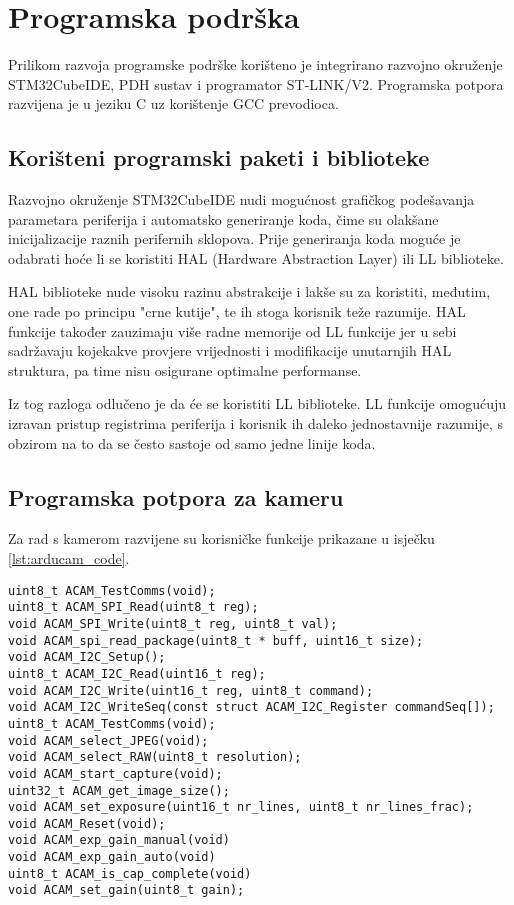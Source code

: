 \chapter{Programska podrška}

Prilikom razvoja programske podrške korišteno je integrirano razvojno okruženje STM32CubeIDE, PDH sustav i programator ST-LINK/V2. Programska potpora razvijena je u jeziku C uz korištenje GCC prevodioca.

\section{Korišteni programski paketi i biblioteke}

Razvojno okruženje STM32CubeIDE nudi mogućnost grafičkog podešavanja parametara periferija i automatsko generiranje koda, čime su olakšane inicijalizacije raznih perifernih sklopova. Prije generiranja koda moguće je odabrati hoće li se koristiti HAL \engl(Hardware Abstraction Layer) ili LL  biblioteke.

HAL biblioteke nude visoku razinu abstrakcije i lakše su za koristiti, međutim, one rade po principu "crne kutije", te ih stoga korisnik teže razumije. HAL funkcije također zauzimaju više radne memorije od LL funkcije jer u sebi sadržavaju kojekakve provjere vrijednosti i modifikacije unutarnjih HAL struktura, pa time nisu osigurane optimalne performanse.

Iz tog razloga odlučeno je da će se koristiti LL biblioteke. LL funkcije omogućuju izravan pristup registrima periferija i korisnik ih daleko jednostavnije razumije, s obzirom na to da se često sastoje od samo jedne linije koda.

\section{Programska potpora za kameru}

Za rad s kamerom razvijene su korisničke funkcije prikazane u isječku \ref{lst:arducam_code}.

\begin{lstlisting}[caption=Korisničke funkcije za Arducam 5MP Mini Plus, label={lst:arducam_code}]
uint8_t ACAM_TestComms(void);
uint8_t ACAM_SPI_Read(uint8_t reg);
void ACAM_SPI_Write(uint8_t reg, uint8_t val);
void ACAM_spi_read_package(uint8_t * buff, uint16_t size);
void ACAM_I2C_Setup();
uint8_t ACAM_I2C_Read(uint16_t reg);
void ACAM_I2C_Write(uint16_t reg, uint8_t command);
void ACAM_I2C_WriteSeq(const struct ACAM_I2C_Register commandSeq[]);
uint8_t ACAM_TestComms(void);
void ACAM_select_JPEG(void);
void ACAM_select_RAW(uint8_t resolution);
void ACAM_start_capture(void);
uint32_t ACAM_get_image_size();
void ACAM_set_exposure(uint16_t nr_lines, uint8_t nr_lines_frac);
void ACAM_Reset(void);
void ACAM_exp_gain_manual(void)
void ACAM_exp_gain_auto(void)
uint8_t ACAM_is_cap_complete(void)
void ACAM_set_gain(uint8_t gain);
\end{lstlisting}

